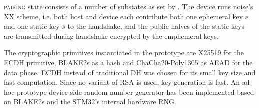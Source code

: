 \documentclass[12pt,a4paper,notitlepage]{article}
\begin{document}
\textsc{pairing} state consists of a number of substates as set by \textcite{perrin01}. The device runs noise's
\textsc{XX} scheme, i.e. both host and device each contribute both one ephemeral key $e$ and one static key $s$ to the
handshake, and the public halves of the static keys are transmitted during handshake encrypted by the emphemeral keys.

The cryptographic primitives instantiated in the prototype are X25519 for the ECDH primitive, BLAKE2s as a hash and
ChaCha20-Poly1305 as AEAD for the data phase. ECDH instead of traditional DH was chosen for its small key size and fast
computation. Since no variant of RSA is used, key generation is fast. An ad-hoc prototype device-side random number
generator has been implemented based on BLAKE2s and the STM32's internal hardware RNG.
\end{document}
